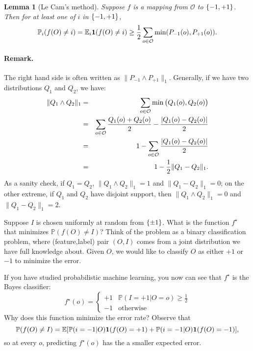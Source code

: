 \documentclass{article}
\newtheorem{lemma}{Lemma}
\newtheorem{definition}{Definition}
\newcommand{\EE}{\mathbb{E}}
\newcommand{\PP}{\mathbb{P}}
\newcommand{\Ocal}{\mathcal{O}}
\newcommand{\defeq}{\triangleq}
\newcommand*{\one}{{\bf 1}}
\begin{document}

\begin{lemma}[Le Cam's method]
Suppose $f$ is a mapping from $\Ocal$ to $\cbr{-1,+1}$. Then for at least one of
$i$ in $\cbr{-1,+1}$,
\[ \PP_i(f(O) \neq i) = \EE_i \one(f(O) \neq i) \geq \frac12\sum_{o \in \Ocal} \min(P_{-1}(o), P_{+1}(o)). \]
\label{lem:lecam}
\end{lemma}

\paragraph{Remark.} The right hand side is often written as
$\| P_{-1} \wedge P_{+1} \|_1$. Generally, if we have two distributions $Q_1$ and $Q_2$,
we have:
\begin{eqnarray*}
  \| Q_1 \wedge Q_2 \|_1 &=& \sum_{o \in \Ocal} \min\del{Q_1(o), Q_2(o)} \\
  &=& \sum_{o \in \Ocal} \frac{Q_1(o) + Q_2(o)}{2} - \frac{|Q_1(o) - Q_2(o)|}{2} \\
  &=& 1 - \sum_{o \in \Ocal} \frac{|Q_1(o) - Q_2(o)|}{2} \\
  &=& 1 - \frac12 \| Q_1 - Q_2 \|_1.
\end{eqnarray*}
As a sanity check, if $Q_1 = Q_2$, $\| Q_1 \wedge Q_2 \|_1 = 1$ and $\| Q_1 - Q_2 \|_1 = 0$;
on the other extreme, if $Q_1$ and $Q_2$ have disjoint support, then $\| Q_1 \wedge Q_2 \|_1 = 0$ and $\| Q_1 - Q_2 \|_1 = 2$.


Suppose $I$ is chosen uniformly at random from $\cbr{\pm 1}$.
What is the function $f^\star$ that minimizes $\PP(f(O) \neq I)$? Think of the problem
as a binary classification problem, where (feature,label) pair $(O,I)$ comes from a joint distribution we have full knowledge about. Given $O$, we would like to classify $O$ as either $+1$ or $-1$ to minimize the error.

If you have studied probabilistic machine learning, you now can see that $f^\star$ is the Bayes classifier:
\[ f^\star(o) = \begin{cases} +1 & \PP(I = +1|O=o) \geq \frac12 \\ -1 & \text{otherwise} \end{cases} \]
Why does this function minimize the error rate? Observe that
\[ \PP(f(O) \neq I)
  = \EE[ \PP(i=-1|O) \one(f(O) = +1) + \PP(i=-1|O) \one(f(O) = -1)], \]
so at every $o$, predicting $f^\star(o)$ has the a smaller expected error.
\end{document}
